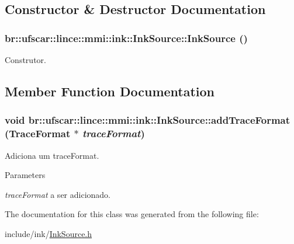 \subsection{Constructor \& Destructor Documentation}
\hypertarget{classbr_1_1ufscar_1_1lince_1_1mmi_1_1ink_1_1InkSource_a5888d2b6cd9e1dde2aafa26c006e7f2a}{
\subsubsection[{InkSource}]{\setlength{\rightskip}{0pt plus 5cm}br::ufscar::lince::mmi::ink::InkSource::InkSource ()}}
\label{classbr_1_1ufscar_1_1lince_1_1mmi_1_1ink_1_1InkSource_a5888d2b6cd9e1dde2aafa26c006e7f2a}


Construtor. 



\subsection{Member Function Documentation}
\hypertarget{classbr_1_1ufscar_1_1lince_1_1mmi_1_1ink_1_1InkSource_a304b6c7e9ef21b86db8a5eb54d3728cc}{
\subsubsection[{addTraceFormat}]{\setlength{\rightskip}{0pt plus 5cm}void br::ufscar::lince::mmi::ink::InkSource::addTraceFormat ({\bf TraceFormat} $\ast$ {\em traceFormat})}}
\label{classbr_1_1ufscar_1_1lince_1_1mmi_1_1ink_1_1InkSource_a304b6c7e9ef21b86db8a5eb54d3728cc}


Adiciona um traceFormat. 


\begin{DoxyParams}{Parameters}
\item[{\em traceFormat}]a ser adicionado. \end{DoxyParams}


The documentation for this class was generated from the following file:\begin{DoxyCompactItemize}
\item 
include/ink/\hyperlink{InkSource_8h}{InkSource.h}\end{DoxyCompactItemize}
